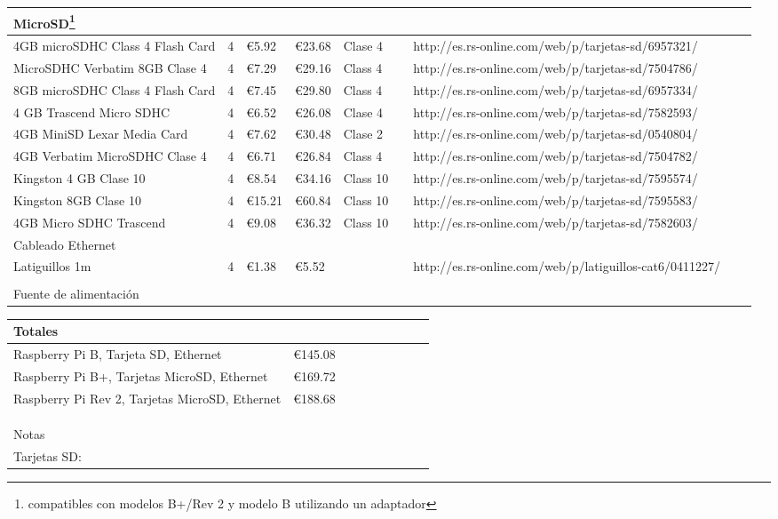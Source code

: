 \begin{landscape}
\begin{tabular}{|l|l|l|l|l|l|l|l|l|}
\hline
MicroSD\footnote{compatibles con modelos B+/Rev 2 y modelo B utilizando un adaptador}&&&&&&\\
\hline
4GB microSDHC Class 4 Flash Card&4&€5.92&€23.68&Clase 4&&http://es.rs-online.com/web/p/tarjetas-sd/6957321/\\
\hline
MicroSDHC Verbatim 8GB Clase 4&4&€7.29&€29.16&Class 4&&http://es.rs-online.com/web/p/tarjetas-sd/7504786/\\
\hline

8GB microSDHC Class 4 Flash Card&4&€7.45&€29.80&Class 4&&http://es.rs-online.com/web/p/tarjetas-sd/6957334/&&\\
\hline
4 GB Trascend Micro SDHC&4&€6.52&€26.08&Clase 4&&http://es.rs-online.com/web/p/tarjetas-sd/7582593/&&\\
\hline
4GB MiniSD Lexar Media Card&4&€7.62&€30.48&Clase 2&&http://es.rs-online.com/web/p/tarjetas-sd/0540804/&&\\
\hline
4GB Verbatim MicroSDHC Clase 4&4&€6.71&€26.84&Class 4&&http://es.rs-online.com/web/p/tarjetas-sd/7504782/&&\\
\hline
\rowcolor{LightCyan}
Kingston 4 GB Clase 10&4&€8.54&€34.16&Class 10&&http://es.rs-online.com/web/p/tarjetas-sd/7595574/&&\\
\hline
\rowcolor{LightCyan}
Kingston 8GB Clase 10&4&€15.21&€60.84&Class 10&&http://es.rs-online.com/web/p/tarjetas-sd/7595583/&&\\
\hline
4GB Micro SDHC Trascend&4&€9.08&€36.32&Class 10&&http://es.rs-online.com/web/p/tarjetas-sd/7582603/&&\\
\hline
Cableado Ethernet&&&&&&&&\\
\hline
Latiguillos 1m&4&€1.38&€5.52&&&http://es.rs-online.com/web/p/latiguillos-cat6/0411227/&&\\
\hline
&&&&&&&&\\
\hline
Fuente de alimentación&&&&&&&&\\
\hline
\end{tabular}
\end{landscape}
\begin{landscape}
\begin{tabular}{|l|l|l|l|l|l|l|l|l|}
Totales&&&&&&&&\\
\hline
Raspberry Pi B, Tarjeta SD, Ethernet&€145.08&&&&&&&\\
\hline
Raspberry Pi B+, Tarjetas MicroSD, Ethernet&€169.72&&&&&&&\\
\hline
Raspberry Pi Rev 2, Tarjetas MicroSD, Ethernet&€188.68&&&&&&&\\
\hline
&&&&&&&&\\
\hline
&&&&&&&&\\
\hline
&&&&&&&&\\
\hline
Notas&&&&&&&&\\
\hline
Tarjetas SD:&&&&&&&&\\
\hline
\end{tabular}
\end{landscape}
